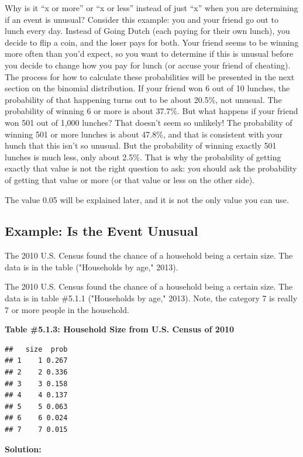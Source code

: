\documentclass[
]{book}
\begin{document}
Why is it ``x or more'' or ``x or less'' instead of just ``x'' when you are determining if an event is unusual? Consider this example: you and your friend go out to lunch every day. Instead of Going Dutch (each paying for their own lunch), you decide to flip a coin, and the loser pays for both. Your friend seems to be winning more often than you'd expect, so you want to determine if this is unusual before you decide to change how you pay for lunch (or accuse your friend of cheating). The process for how to calculate these probabilities will be presented in the next section on the binomial distribution. If your friend won 6 out of 10 lunches, the probability of that happening turns out to be about 20.5\%, not unusual. The probability of winning 6 or more is about 37.7\%. But what happens if your friend won 501 out of 1,000 lunches? That doesn't seem so unlikely! The probability of winning 501 or more lunches is about 47.8\%, and that is consistent with your hunch that this isn't so unusual. But the probability of winning exactly 501 lunches is much less, only about 2.5\%. That is why the probability of getting exactly that value is not the right question to ask: you should ask the probability of getting that value or more (or that value or less on the other side).

The value 0.05 will be explained later, and it is not the only value you can use.

\hypertarget{example-is-the-event-unusual}{%
\subsection{Example: Is the Event Unusual}\label{example-is-the-event-unusual}}

The 2010 U.S. Census found the chance of a household being a certain size. The data is in the table ("Households by age," 2013).

The 2010 U.S. Census found the chance of a household being a certain size. The data is in table \#5.1.1 ("Households by age," 2013). Note, the category 7 is really 7 or more people in the household.

\textbf{Table \#5.1.3: Household Size from U.S. Census of 2010}

\begin{verbatim}
##   size  prob
## 1    1 0.267
## 2    2 0.336
## 3    3 0.158
## 4    4 0.137
## 5    5 0.063
## 6    6 0.024
## 7    7 0.015
\end{verbatim}

\textbf{Solution:}
\end{document}
